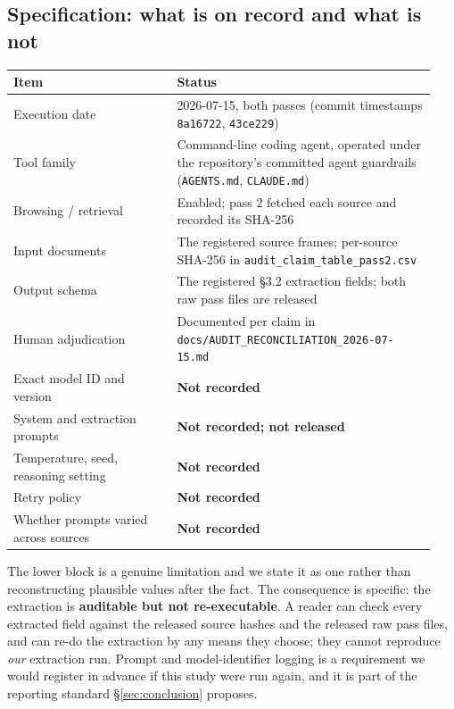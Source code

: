 \subsection{Specification: what is on record and what is not}

\begin{tabular}{@{}p{0.36\linewidth}p{0.58\linewidth}@{}}
\toprule
Item & Status \\
\midrule
Execution date & 2026-07-15, both passes (commit timestamps
  \texttt{8a16722}, \texttt{43ce229}) \\
Tool family & Command-line coding agent, operated under the repository's
  committed agent guardrails (\texttt{AGENTS.md}, \texttt{CLAUDE.md}) \\
Browsing / retrieval & Enabled; pass 2 fetched each source and recorded its
  SHA-256 \\
Input documents & The registered source frames; per-source SHA-256 in
  \texttt{audit\_\allowbreak{}claim\_\allowbreak{}table\_\allowbreak{}pass2.csv} \\
Output schema & The registered \S3.2 extraction fields; both raw pass files
  are released \\
Human adjudication & Documented per claim in
  \texttt{docs/\allowbreak{}AUDIT\_\allowbreak{}RECONCILIATION\_\allowbreak{}2026-07-15.md} \\
\midrule
Exact model ID and version & \textbf{Not recorded} \\
System and extraction prompts & \textbf{Not recorded; not released} \\
Temperature, seed, reasoning setting & \textbf{Not recorded} \\
Retry policy & \textbf{Not recorded} \\
Whether prompts varied across sources & \textbf{Not recorded} \\
\bottomrule
\end{tabular}

\medskip
\noindent
The lower block is a genuine limitation and we state it as one rather than
reconstructing plausible values after the fact. The consequence is specific:
the extraction is \textbf{auditable but not re-executable}. A reader can check
every extracted field against the released source hashes and the released raw
pass files, and can re-do the extraction by any means they choose; they cannot
reproduce \emph{our} extraction run. Prompt and model-identifier logging is a
requirement we would register in advance if this study were run again, and it is
part of the reporting standard \S\ref{sec:conclusion} proposes.

